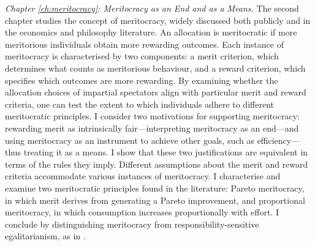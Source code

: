 \emph{Chapter \ref{ch:meritocracy}: Meritocracy as an End and as a Means.} The second chapter studies the concept of meritocracy, widely discussed both publicly and in the economics and philosophy literature. An allocation is meritocratic if more meritorious individuals obtain more rewarding outcomes. Each instance of meritocracy is characterised by two components: a merit criterion, which determines what counts as meritorious behaviour, and a reward criterion, which specifies which outcomes are more rewarding. By examining whether the allocation choices of impartial spectators align with particular merit and reward criteria, one can test the extent to which individuals adhere to different meritocratic principles. I consider two motivations for supporting meritocracy: rewarding merit as intrinsically fair—interpreting meritocracy as an end—and using meritocracy as an instrument to achieve other goals, such as efficiency—thus treating it as a means. I show that these two justifications are equivalent in terms of the rules they imply. Different assumptions about the merit and reward criteria accommodate various instances of meritocracy. I characterise and examine two meritocratic principles found in the literature: Pareto meritocracy, in which merit derives from generating a Pareto improvement, and proportional meritocracy, in which consumption increases proportionally with effort. I conclude by distinguishing meritocracy from responsibility-sensitive egalitarianism, as in \citep{fleurbaey2008fairness}.

